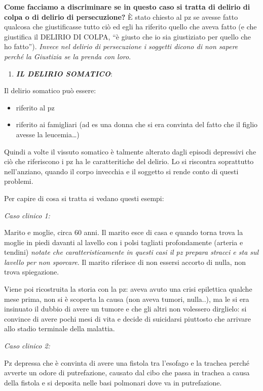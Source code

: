 \documentclass[]{article}
\begin{document}
\textbf{Come facciamo a discriminare se in questo caso si tratta di
delirio di colpa o di delirio di persecuzione?} È stato chiesto al pz se
avesse fatto qualcosa che giustificasse tutto ciò ed egli ha riferito
quello che aveva fatto (e che giustifica il DELIRIO DI COLPA, ``è giusto
che io sia giustiziato per quello che ho fatto''). \emph{Invece nel
delirio di persecuzione i soggetti dicono di non sapere perché la
Giustizia se la prenda con loro}.

\begin{enumerate}
\def\labelenumi{\arabic{enumi}.}
\item
  \textbf{\emph{IL DELIRIO SOMATICO}}:
\end{enumerate}

Il delirio somatico può essere:

\begin{itemize}
\item
  riferito al pz
\item
  riferito ai famigliari (ad es una donna che si era convinta del fatto
  che il figlio avesse la leucemia\ldots{})
\end{itemize}

Quindi a volte il vissuto somatico è talmente alterato dagli episodi
depressivi che ciò che riferiscono i pz ha le caratteritiche del
delirio. Lo si riscontra soprattutto nell'anziano, quando il corpo
invecchia e il soggetto si rende conto di questi problemi.

Per capire di cosa si tratta si vedano questi esempi:

\emph{Caso clinico 1:}

Marito e moglie, circa 60 anni. Il marito esce di casa e quando torna
trova la moglie in piedi davanti al lavello con i polsi tagliati
profondamente (arteria e tendini) \emph{notate che caratteristicamente
in questi casi il pz prepara stracci e sta sul lavello per non
sporcare}. Il marito riferisce di non essersi accorto di nulla, non
trova spiegazione.

Viene poi ricostruita la storia con la pz: aveva avuto una crisi
epilettica qualche mese prima, non si è scoperta la causa (non aveva
tumori, nulla..), ma le si era insinuato il dubbio di avere un tumore e
che gli altri non volessero dirglielo: si convince di avere pochi mesi
di vita e decide di suicidarsi piuttosto che arrivare allo stadio
terminale della malattia.

\emph{Caso clinico 2:}

Pz depressa che è convinta di avere una fistola tra l'esofago e la
trachea perché avverte un odore di putrefazione, causato dal cibo che
passa in trachea a causa della fistola e si deposita nelle basi
polmonari dove va in putrefazione.
\end{document}
